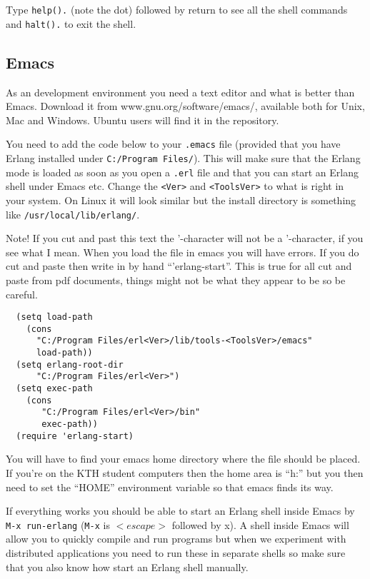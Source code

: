 \documentclass[a4paper,11pt]{article}
\begin{document}
\noindent Type {\tt help().} (note the dot) followed by return to see all the
shell commands and {\tt halt().} to exit the shell.


\subsection{Emacs}

As an development environment you need a text editor and what is
better than Emacs. Download it from www.gnu.org/software/emacs/,
available both for Unix, Mac and Windows. Ubuntu users will find it in
the repository.

You need to add the code below to your {\tt .emacs} file (provided
that you have Erlang installed under {\tt C:/Program Files/}). This
will make sure that the Erlang mode is loaded as soon as you open a
{\tt .erl} file and that you can start an Erlang shell under Emacs
etc. Change the {\tt <Ver>} and {\tt <ToolsVer>} to what is right in
your system. On Linux it will look similar but the install
directory is something like {\tt /usr/local/lib/erlang/}.

Note! If you cut and past this text the '-character will not be a
'-character, if you see what I mean. When you load the file in emacs
you will have errors. If you do cut and paste then write in by hand
``'erlang-start''. This is true for all cut and paste from pdf
documents, things might not be what they appear to be so be careful.

\begin{verbatim}
  (setq load-path 
    (cons  
      "C:/Program Files/erl<Ver>/lib/tools-<ToolsVer>/emacs" 
      load-path))
  (setq erlang-root-dir 
      "C:/Program Files/erl<Ver>")
  (setq exec-path 
    (cons 
       "C:/Program Files/erl<Ver>/bin" 
       exec-path))
  (require 'erlang-start)
\end{verbatim}

\noindent You will have to find your emacs home directory where the file should
be placed. If you're on the KTH student computers then the home area
is ``h:'' but you then need to set the ``HOME'' environment variable
so that emacs finds its way. 

If everything works you should be able to start an Erlang shell inside
Emacs by {\tt M-x run-erlang} ({\tt M-x} is $<escape>$ followed by
x). A shell inside Emacs will allow you to quickly compile and run
programs but when we experiment with distributed applications you need
to run these in separate shells so make sure that you also know how
start an Erlang shell manually.
\end{document}
